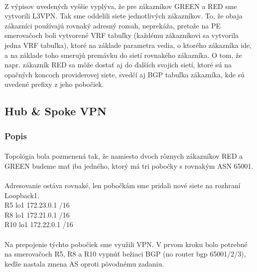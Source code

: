 \documentclass[12pt,twoside,a4paper]{report}
\newcommand\tab[1][1cm]{\hspace*{#1}}
\begin{document}
\paragraph{}
Z výpisov uvedených vyššie vyplýva, že pre zákazníkov GREEN a RED sme vytvorili L3VPN. Tak sme oddelili siete jednotlivých zákazníkov. To, že obaja zákazníci používajú rovnaký adresný rozsah, neprekáža, pretože na PE smerovačoch boli vytvorené VRF tabuľky (každému zákazníkovi sa vytvorila jedna VRF tabuľka), ktoré na základe  parametra vedia, o ktorého zákazníka ide, a na základe toho smerujú premávku do sietí rovnakého zákazníka. O tom, že napr. zákazník RED sa môže dostať aj do ďalších svojich sietí, ktoré sú na opačných koncoch providerovej siete, svedčí aj BGP tabuľka zákazníka, kde sú uvedené prefixy z jeho pobočiek.










\subsection{Hub \& Spoke VPN}
\subsubsection{Popis}
\paragraph{}
Topológia bola pozmenená tak, že namiesto dvoch rôznych zákazníkov RED a GREEN budeme mať iba jedného, ktorý má tri pobočky s rovnakým ASN 65001.

\paragraph{}
Adresovanie ostáva rovnaké, len pobočkám sme pridali nové siete na rozhraní Loopback1.\\
\tab[2cm]R5 \tab[2cm] lo1\tab[2cm] 172.23.0.1 /16\\
\tab[2cm]R8 \tab[2cm] lo1\tab[2cm] 172.21.0.1 /16\\
\tab[2cm]R10 \tab[1.8cm] lo1\tab[2cm] 172.22.0.1 /16

\paragraph{}
Na prepojenie týchto pobočiek sme využili VPN. V prvom kroku bolo potrebné na smerovačoch R5, R8 a R10 vypnúť bežiaci BGP (no router bgp 65001/2/3), keďže nastala zmena AS oproti pôvodnému zadaniu.
\end{document}
